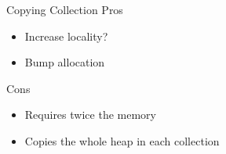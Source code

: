 \documentclass[
14pt,
aspectratio=169,
usenames,
dvipsnames,
x11names]{beamer}
\newcommand{\tik}[0]{{\color{YellowGreen}\Checkmark}} %
\newcommand{\ex}[0]{{\color{BrickRed}\XSolidBrush}}  %
\begin{document}
\begin{frame}{Copying Collection}
  Pros \tik
  \begin{itemize}  \setlength{\itemsep}{\fill}
  \item \alert{Increase locality?}
  \item \alert{Bump} allocation
  \end{itemize}

  \pause

  Cons \ex
  \begin{itemize}  \setlength{\itemsep}{\fill}
  \item Requires \alert{twice the memory}
  \item \alert{Copies the whole heap} in each collection
  \end{itemize}
\end{frame}


\end{document}
